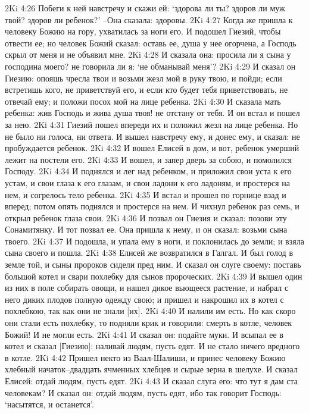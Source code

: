 2Ki 4:26  Побеги к ней навстречу и скажи ей: `здорова ли ты? здоров ли муж твой? здоров ли ребенок?' --Она сказала: здоровы.
2Ki 4:27  Когда же пришла к человеку Божию на гору, ухватилась за ноги его. И подошел Гиезий, чтобы отвести ее; но человек Божий сказал: оставь ее, душа у нее огорчена, а Господь скрыл от меня и не объявил мне.
2Ki 4:28  И сказала она: просила ли я сына у господина моего? не говорила ли я: `не обманывай меня'?
2Ki 4:29  И сказал он Гиезию: опояшь чресла твои и возьми жезл мой в руку твою, и пойди; если встретишь кого, не приветствуй его, и если кто будет тебя приветствовать, не отвечай ему; и положи посох мой на лице ребенка.
2Ki 4:30  И сказала мать ребенка: жив Господь и жива душа твоя! не отстану от тебя. И он встал и пошел за нею.
2Ki 4:31  Гиезий пошел впереди их и положил жезл на лице ребенка. Но не было ни голоса, ни ответа. И вышел навстречу ему, и донес ему, и сказал: не пробуждается ребенок.
2Ki 4:32  И вошел Елисей в дом, и вот, ребенок умерший лежит на постели его.
2Ki 4:33  И вошел, и запер дверь за собою, и помолился Господу.
2Ki 4:34  И поднялся и лег над ребенком, и приложил свои уста к его устам, и свои глаза к его глазам, и свои ладони к его ладоням, и простерся на нем, и согрелось тело ребенка.
2Ki 4:35  И встал и прошел по горнице взад и вперед; потом опять поднялся и простерся на нем. И чихнул ребенок раз семь, и открыл ребенок глаза свои.
2Ki 4:36  И позвал он Гиезия и сказал: позови эту Сонамитянку. И тот позвал ее. Она пришла к нему, и он сказал: возьми сына твоего.
2Ki 4:37  И подошла, и упала ему в ноги, и поклонилась до земли; и взяла сына своего и пошла.
2Ki 4:38  Елисей же возвратился в Галгал. И был голод в земле той, и сыны пророков сидели пред ним. И сказал он слуге своему: поставь большой котел и свари похлебку для сынов пророческих.
2Ki 4:39  И вышел один из них в поле собирать овощи, и нашел дикое вьющееся растение, и набрал с него диких плодов полную одежду свою; и пришел и накрошил их в котел с похлебкою, так как они не знали [их].
2Ki 4:40  И налили им есть. Но как скоро они стали есть похлебку, то подняли крик и говорили: смерть в котле, человек Божий! И не могли есть.
2Ki 4:41  И сказал он: подайте муки. И всыпал ее в котел и сказал [Гиезию]: наливай людям, пусть едят. И не стало ничего вредного в котле.
2Ki 4:42  Пришел некто из Ваал-Шалиши, и принес человеку Божию хлебный начаток--двадцать ячменных хлебцев и сырые зерна в шелухе. И сказал Елисей: отдай людям, пусть едят.
2Ki 4:43  И сказал слуга его: что тут я дам ста человекам? И сказал он: отдай людям, пусть едят, ибо так говорит Господь: `насытятся, и останется'.
